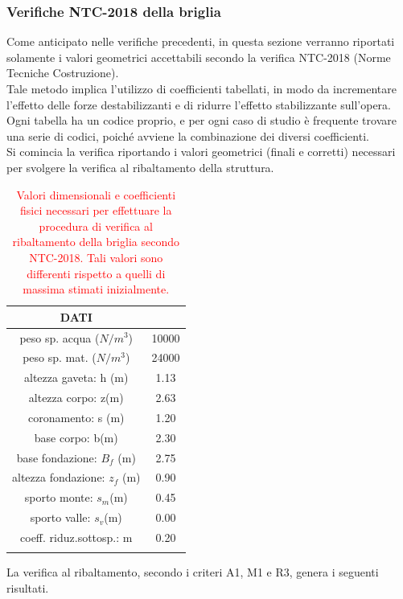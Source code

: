 \subsubsection{Verifiche NTC-2018 della briglia}
Come anticipato nelle verifiche precedenti, in questa sezione verranno riportati solamente i valori geometrici accettabili secondo la verifica NTC-2018 (Norme Tecniche Costruzione).\\
Tale metodo implica l'utilizzo di coefficienti tabellati, in modo da incrementare l'effetto delle forze destabilizzanti e di ridurre l'effetto stabilizzante sull'opera. Ogni tabella ha un codice proprio, e per ogni caso di studio è frequente trovare una serie di codici, poiché avviene la combinazione dei diversi coefficienti.\\
Si comincia la verifica riportando i valori geometrici (finali e corretti) necessari per svolgere la verifica al ribaltamento della struttura.
\begin{table}[H] \centering
    \caption{\textcolor{red}{Valori dimensionali e coefficienti fisici necessari per effettuare la procedura di verifica al ribaltamento della briglia secondo NTC-2018. Tali valori sono differenti rispetto a quelli di massima stimati inizialmente.}}
    \begin{tabular}{cc}
    \toprule    
        DATI & \\
    \bottomrule
    peso sp. acqua ($N/m^3$)      & 10000 \\
    peso sp. mat. ($N/m^3$)       & 24000 \\
    altezza gaveta: h (m)      & 1.13  \\
    altezza corpo: z(m)        & 2.63  \\
    coronamento: s (m)         & 1.20  \\
    base corpo: b(m)           & 2.30  \\
    base fondazione: $B_f$ (m)    & 2.75  \\
    altezza fondazione: $z_f$ (m) & 0.90  \\
    sporto monte: $s_m$(m)         & 0.45  \\
    sporto valle: $s_v$(m)        & 0.00  \\
    coeff. riduz.sottosp.: m   & 0.20  \\
    \bottomrule
    \label{valori_dimensionali_NTC2018}
    \end{tabular}
\end{table}
La verifica al ribaltamento, secondo i criteri A1, M1 e R3, genera i seguenti risultati.
